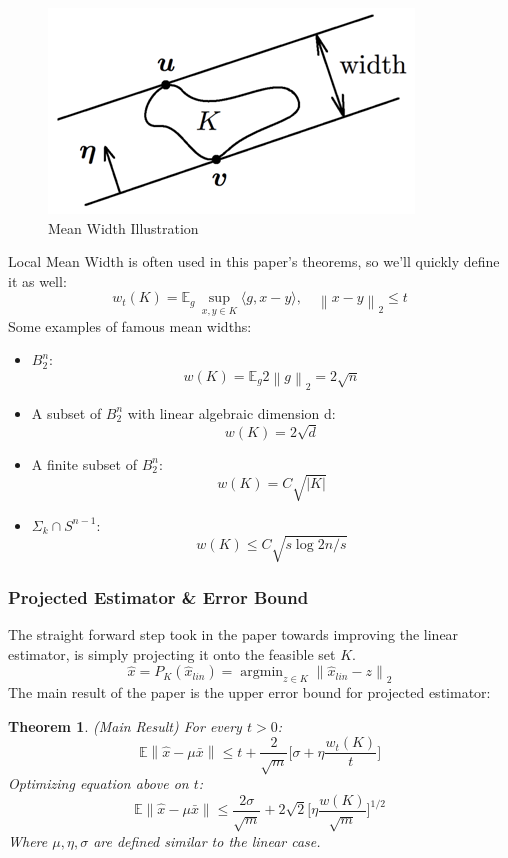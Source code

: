 \documentclass{amsart}
\newtheorem{theorem}{Theorem}[section]
\theoremstyle{definition}
\theoremstyle{remark}
\numberwithin{equation}{section}
\newcommand\norm[1]{\left\lVert#1\right\rVert}
\newcommand{\blankbox}[2]{%
  \parbox{\columnwidth}{\centering
    \setlength{\fboxsep}{0pt}%
    \fbox{\raisebox{0pt}[#2]{\hspace{#1}}}%
  }%
}
\DeclareMathOperator*{\argmin}{argmin}
\begin{document}
\begin{figure}[tb]
\includegraphics{meanwidth.png}
\caption{Mean Width Illustration}
\label{firstfig}
\end{figure}

Local Mean Width is often used in this paper's theorems, so we'll quickly define it as well:
\[
w_t(K) = \mathbb{E}_g \, \sup_{x,y\in K} \langle g,x-y\rangle ,\quad \norm{x-y}_2\leq t
\]
Some examples of famous mean widths:
\begin{itemize}
\item $B_2^n$:
\[
w(K) = \mathbb{E}_g 2 \norm{g}_2 = 2\sqrt{n}
\]
\item A subset of $B_2^n$ with linear algebraic dimension d:
\[
w(K) = 2 \sqrt{d}
\]
\item A finite subset of $B_2^n$:
\[w(K) = C\sqrt{\vert K \vert}
\]
\item $\Sigma_k \cap S^{n-1}$:
\[
w(K) \leq C \sqrt{s \log 2n/s}
\]
\end{itemize}

\subsubsection{\textbf{Projected Estimator \& Error Bound}}

The straight forward step took in the paper towards improving the linear estimator, is simply projecting it onto the feasible set $K$.
\[
\hat{x} = P_K(\hat{x}_{lin}) = \argmin_{z \in K} \norm{\hat{x}_{lin}-z}_2
\]
The main result of the paper is the upper error bound for projected estimator:
\begin{theorem}(Main Result)
For every $t>0$:
\[
\mathbb{E}\norm{\hat{x}-\mu\bar{x}}\leq t+ \frac{2}{\sqrt{m}}\bigg[ \sigma + \eta \frac{w_t(K)}{t}\bigg]
\]
Optimizing equation above on $t$:
\[
\mathbb{E}\norm{\hat{x}-\mu\bar{x}} \leq \frac{2\sigma}{\sqrt{m}} + 2\sqrt{2}\bigg[\eta \frac{w(K)}{\sqrt{m}}\bigg]^{1/2}
\]
Where $\mu,\eta,\sigma$ are defined similar to the linear case.
\end{theorem}
\end{document}

